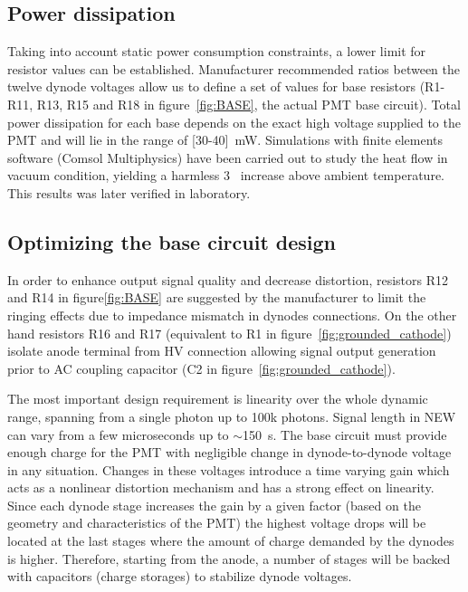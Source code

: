 \documentclass[a4paper, 10pt, oneside, twocolumn, 3p]{elsarticle}
\begin{document}
\subsection {Power dissipation}

\par Taking into account static power consumption constraints, a lower limit for resistor values can be established. Manufacturer recommended ratios between the twelve dynode voltages allow us to define a set of values for base resistors (R1-R11, R13, R15 and R18 in figure~\ref{fig:BASE}, the actual PMT base circuit). Total power dissipation for each base depends on the exact high voltage supplied to the PMT and will lie in the range of [30-40]~mW. Simulations with finite elements software (Comsol Multiphysics) have been carried out to study the heat flow in vacuum condition, yielding a harmless 3~ increase above ambient temperature. This results was later verified in laboratory.


\subsection {Optimizing the base circuit design}

\par In order to enhance output signal quality and decrease distortion, resistors R12 and R14 in figure\ref{fig:BASE} are suggested by the manufacturer to limit the ringing effects due to impedance mismatch in dynodes connections. On the other hand resistors R16 and R17 (equivalent to R1 in figure~\ref{fig:grounded_cathode}) isolate anode terminal from HV connection allowing signal output generation prior to AC coupling capacitor (C2 in figure~\ref{fig:grounded_cathode}). 

\par The most important design requirement is linearity over the whole dynamic range, spanning from a single photon up to 100k photons. Signal length in NEW can vary from a few microseconds up to $\sim$150~\textmu s. The base circuit must provide enough charge for the PMT with negligible change in dynode-to-dynode voltage in any situation. Changes in these voltages introduce a time varying gain which acts as a nonlinear distortion mechanism and has a strong effect on linearity. Since each dynode stage increases the gain by a given factor (based on the geometry and characteristics of the PMT) the highest voltage drops will be located at the last stages where the amount of charge demanded by the dynodes is higher. Therefore, starting from the anode, a number of stages will be backed with capacitors (charge storages) to stabilize dynode voltages. 
 
\end{document}
